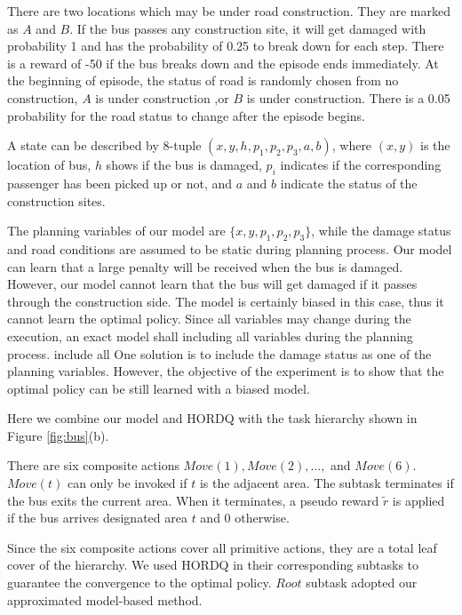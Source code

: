 \documentclass{article} %
\begin{document}
There are two locations which may be under road construction. They are marked as 
$A$ and $B$. If the bus passes any construction site, it will get damaged with probability 1 and has the probability
of 0.25 to break down for each step. There is a reward of -50 if the bus breaks down and the episode ends immediately. 
At the beginning of episode, the status of road is randomly chosen from no construction, $A$ is under construction
,or $B$ is under construction. There is a 0.05 probability for the road status to change after the episode begins.

A state can be described by 8-tuple $(x, y, h, p_1, p_2, p_3, a, b)$, where $(x, y)$ is the location of 
bus, $h$ shows if the bus is damaged, $p_i$ indicates if the corresponding passenger has been picked up or not,
and $a$ and $b$ indicate the status of the construction sites.

The planning variables of our model are $\{x, y, p_1, p_2, p_3\}$, while the damage
status and road conditions are assumed to be static during planning process.
Our model can learn that a large penalty will be received when the bus is damaged.  
However, our model cannot learn that the bus will get damaged if it passes through
the construction side. The model is certainly biased in this case, thus
it cannot learn the optimal policy. Since all variables may change during 
the execution, an exact model shall including all variables during the planning process. include all
One solution is to include the damage 
status as one of the planning variables. However, the objective of 
the experiment is to show that the optimal policy can be still learned
with a biased model. 

Here we combine our model and HORDQ with
the task hierarchy shown in Figure \ref{fig:bus}(b). 

There are six composite actions $Move(1), Move(2), \dots,$ and $Move(6)$.
$Move(t)$ can only be invoked if $t$ is the adjacent area.
The subtask terminates if the bus exits the current area.
When it terminates, a pseudo reward $\tilde{r}$ is applied if the bus arrives designated area $t$ and 0 otherwise.

Since the six composite actions cover all primitive actions, they are a total leaf cover of the hierarchy.
We used HORDQ in their corresponding subtasks to guarantee the convergence to the optimal
policy. $Root$ subtask adopted our approximated model-based method. 
\end{document}
